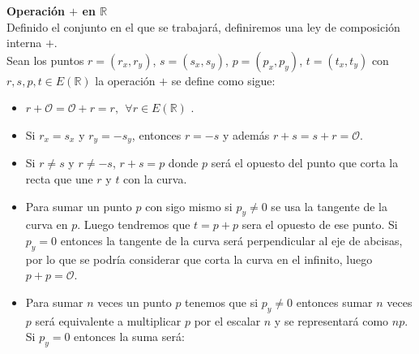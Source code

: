 \textbf{Operación $+$ en $\mathbb{R}$}\\
Definido el conjunto en el que se trabajará, definiremos una ley de composición interna $+$.\\
Sean los puntos $r=(r_x,r_y)$, $s=(s_x,s_y)$, $p=(p_x,p_y)$, $t=(t_x,t_y)$ con $r,s,p,t \in E(\mathbb{R})$ la operación $+$ se define como sigue:
\begin{itemize}
	\item $r+\mathcal{O} = \mathcal{O}+r=r,\:\: \forall r \in E(\mathbb{R})$ .
	\item Si $r_x = s_x$ y $r_y = -s_y$, entonces $r=-s$ y además $r+s=s+r=\mathcal{O}$.
	\item Si $r\neq s$ y $r\neq -s$, $r+s=p$ donde $p$ será el opuesto del punto que corta la recta que une $r$ y $t$ con la curva.
	\item Para sumar un punto $p$ con sigo mismo si $p_y\neq0$ se usa la tangente de la curva en $p$. Luego tendremos que $t=p+p$ sera el opuesto de ese punto. Si $p_y=0$ entonces la tangente de la curva será perpendicular al eje de abcisas, por lo que se podría considerar que corta la curva en el infinito, luego $p+p=\mathcal{O}$.
	\item Para sumar $n$ veces un punto $p$ tenemos que si $p_y\neq 0$ entonces sumar $n$ veces $p$ será equivalente a multiplicar $p$ por el escalar $n$ y se representará como $np$. Si $p_y=0$ entonces la suma será:
\end{itemize}
